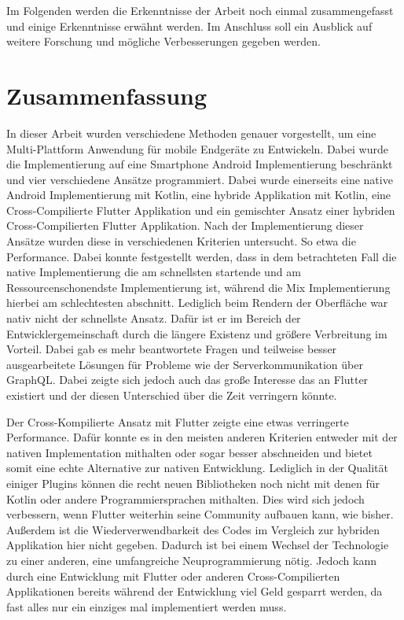 Im Folgenden werden die Erkenntnisse der Arbeit noch einmal zusammengefasst und einige Erkenntnisse erwähnt werden. Im Anschluss soll ein Ausblick auf weitere Forschung und mögliche Verbesserungen gegeben werden.

\section{Zusammenfassung}
In dieser Arbeit wurden verschiedene Methoden genauer vorgestellt, um eine Multi-Plattform Anwendung für mobile Endgeräte zu Entwickeln. Dabei wurde die Implementierung auf eine Smartphone Android Implementierung beschränkt und vier verschiedene Ansätze programmiert. Dabei wurde einerseits eine native Android Implementierung mit Kotlin, eine hybride Applikation mit Kotlin, eine Cross-Compilierte Flutter Applikation und ein gemischter Ansatz einer hybriden Cross-Compilierten Flutter Applikation. Nach der Implementierung dieser Ansätze wurden diese in verschiedenen Kriterien untersucht. So etwa die Performance. Dabei konnte festgestellt werden, dass in dem betrachteten Fall die native Implementierung die am schnellsten startende und am Ressourcenschonendste Implementierung ist, während die Mix Implementierung hierbei am schlechtesten abschnitt. Lediglich beim Rendern der Oberfläche war nativ nicht der schnellste Ansatz. Dafür ist er im Bereich der Entwicklergemeinschaft durch die längere Existenz und größere Verbreitung im Vorteil. Dabei gab es mehr beantwortete Fragen und teilweise besser ausgearbeitete Lösungen für Probleme wie der Serverkommunikation über GraphQL. Dabei zeigte sich jedoch auch das große Interesse das an Flutter existiert und der diesen Unterschied über die Zeit verringern könnte.

Der Cross-Kompilierte Ansatz mit Flutter zeigte eine etwas verringerte Performance. Dafür konnte es in den meisten anderen Kriterien entweder mit der nativen Implementation mithalten oder sogar besser abschneiden und bietet somit eine echte Alternative zur nativen Entwicklung. Lediglich in der Qualität einiger Plugins können die recht neuen Bibliotheken noch nicht mit denen für Kotlin oder andere Programmiersprachen mithalten. Dies wird sich jedoch verbessern, wenn Flutter weiterhin seine Community aufbauen kann, wie bisher. Außerdem ist die Wiederverwendbarkeit des Codes im Vergleich zur hybriden Applikation hier nicht gegeben. Dadurch ist bei einem Wechsel der Technologie zu einer anderen, eine umfangreiche Neuprogrammierung nötig.
Jedoch kann durch eine Entwicklung mit Flutter oder anderen Cross-Compilierten Applikationen bereits während der Entwicklung viel Geld gesparrt werden, da fast alles nur ein einziges mal implementiert werden muss.

